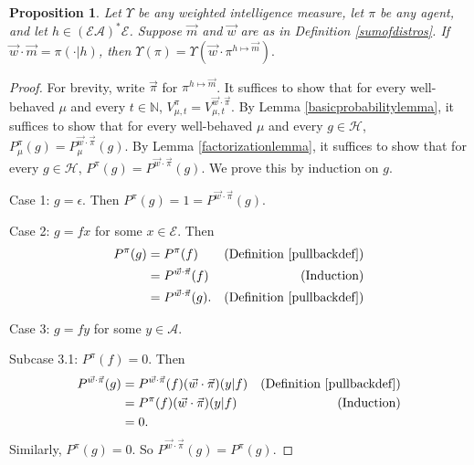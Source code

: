 \documentclass[twoside]{article}
\newtheorem{proposition}[theorem]{Proposition}
\begin{document}
\begin{proposition}
\label{longproposition}
    Let $\Upsilon$ be any weighted intelligence measure, let $\pi$ be any agent,
    and let $h\in(\mathcal E\mathcal A)^*\mathcal E$.
    Suppose $\vec m$ and $\vec w$ are as in Definition \ref{sumofdistros}.
    If $\vec w\cdot\vec m = \pi(\cdot|h)$, then
    $
        \Upsilon(\pi)
        =
        \Upsilon(\vec w\cdot \pi^{h\mapsto \vec m}).
    $
\end{proposition}

\begin{proof}
    For brevity, write $\vec\pi$ for $\pi^{h\mapsto \vec m}$. It suffices to
    show that for every well-behaved $\mu$ and every $t\in\mathbb N$,
    $
        V^{\pi}_{\mu,t}
        =
        V^{\vec w\cdot \vec\pi}_{\mu,t}.
    $
    By Lemma \ref{basicprobabilitylemma}, it suffices to show that for every
    well-behaved $\mu$ and every $g\in\mathcal H$,
    $
    P^\pi_\mu(g)
    =
    P^{\vec w\cdot\vec\pi}_\mu(g)
    $.
    By Lemma \ref{factorizationlemma}, it suffices
    to show that for every $g\in\mathcal H$,
    $P^\pi(g)=P^{\vec w\cdot\vec\pi}(g)$.
    We prove this by induction on $g$.

    Case 1: $g=\epsilon$.
    Then $P^\pi(g)=1
    =P^{\vec w\cdot\vec\pi}(g)$.

    Case 2: $g=fx$ for some $x\in\mathcal E$.
    Then
    \begin{align*}
        P^\pi(g)
            &= P^\pi(f)
                &\mbox{(Definition \ref{pullbackdef})}\\
            &= P^{\vec w\cdot\vec\pi}(f)
                &\mbox{(Induction)}\\
            &= P^{\vec w\cdot\vec\pi}(g).
                &\mbox{(Definition \ref{pullbackdef})}
    \end{align*}

    Case 3: $g=fy$ for some $y\in\mathcal A$.

    Subcase 3.1: $P^\pi(f)=0$.
    Then
    \begin{align*}
        P^{\vec w\cdot\vec\pi}(g)
            &= P^{\vec w\cdot\vec\pi}(f)
            (\vec w\cdot\vec\pi)(y|f)
                &\mbox{(Definition \ref{pullbackdef})}\\
            &= P^\pi(f)(\vec w\cdot\vec\pi)(y|f)
                &\mbox{(Induction)}\\
            &= 0.
    \end{align*}
    Similarly, $P^\pi(g)=0$. So $P^{\vec w\cdot\vec\pi}(g)=P^\pi(g)$.


\end{proof}
\end{document}
